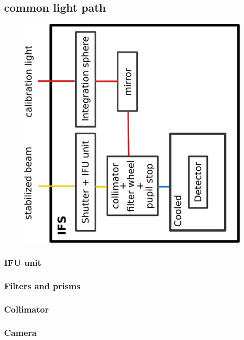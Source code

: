 \documentclass[twoside,single]{lion-msc}
\begin{document}
\subsection{common light path}
\begin{figure}[htbp]
\centering 
\includegraphics[trim={13cm 5cm 10cm 7cm},clip,scale = 0.47]{overviewIFS}
\caption{} 
\label{}
\end{figure}

\subsubsection{IFU unit}
\subsubsection{Filters and prisms}
\subsubsection{Collimator}
\subsubsection{Camera}
\end{document}
